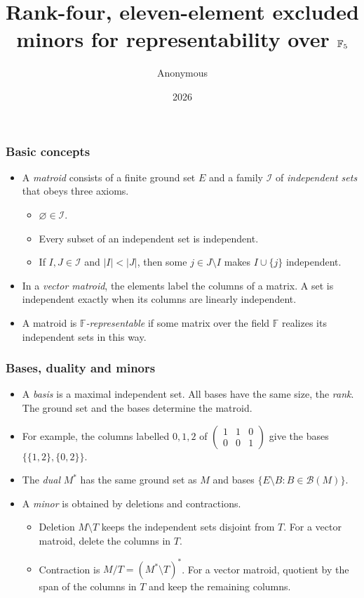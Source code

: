 \documentclass{beamer}
\title[Quinary excluded minors]{Rank-four, eleven-element excluded minors for representability over \texorpdfstring{$\F_5$}{GF(5)}}
\author{Anonymous}
\date{2026}
\newcommand{\F}{\mathbb{F}}
\newcommand{\B}{\mathcal B}
\begin{document}
\frame{\titlepage}

\begin{frame}
  \frametitle{Basic concepts}
  \begin{itemize}
    \item A \emph{matroid} consists of a finite ground set $E$ and a family
      $\mathcal I$ of \emph{independent sets} that obeys three axioms.
      \begin{itemize}
        \item $\varnothing\in\mathcal I$.
        \item Every subset of an independent set is independent.
        \item If $I,J\in\mathcal I$ and $|I|<|J|$, then some
          $j\in J\setminus I$ makes $I\cup\{j\}$ independent.
      \end{itemize}
    \item In a \emph{vector matroid}, the elements label the columns of a
      matrix. A set is independent exactly when its columns are linearly
      independent.
    \item A matroid is \emph{$\F$-representable} if some matrix over the
      field $\F$ realizes its independent sets in this way.
  \end{itemize}
\end{frame}

\begin{frame}
  \frametitle{Bases, duality and minors}
  \begin{itemize}
    \item A \emph{basis} is a maximal independent set. All bases have the
      same size, the \emph{rank}. The ground set and the bases determine
      the matroid.
    \item For example, the columns labelled $0,1,2$ of
      $\left(\begin{smallmatrix}1&1&0\\0&0&1\end{smallmatrix}\right)$
      give the bases $\{\{1,2\},\{0,2\}\}$.
    \item The \emph{dual} $M^*$ has the same ground set as $M$ and bases
      $\{E\setminus B:B\in\B(M)\}$.
    \item A \emph{minor} is obtained by deletions and contractions.
      \begin{itemize}
        \item Deletion $M\setminus T$ keeps the independent sets disjoint
          from $T$. For a vector matroid, delete the columns in $T$.
        \item Contraction is $M/T=(M^*\setminus T)^*$. For a vector
          matroid, quotient by the span of the columns in $T$ and keep
          the remaining columns.
      \end{itemize}
  \end{itemize}
\end{frame}
\end{document}
